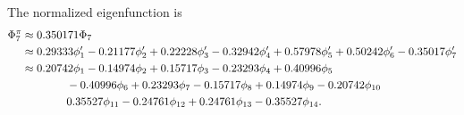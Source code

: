 \documentclass[a4paper]{book}
\begin{document}
\begin{solution}
\begin{enumerate}[label=(\alph*)]
\begin{itemize}
		The normalized eigenfunction is
		\begin{align}
			\Phi^\pi_7 &\approx 0.350171 \Phi_7 \notag \\
			&\approx 0.29333 \phi^\prime_1 - 0.21177 \phi^\prime_2 +0.22228 \phi^\prime_3 -0.32942 \phi^\prime_4 + 0.57978 \phi^\prime_5 + 0.50242 \phi^\prime_6 - 0.35017 \phi^\prime_7\\
			&\approx 0.20742 \phi_1 -0.14974 \phi_2 + 0.15717 \phi_3 -0.23293\phi_4 + 0.40996\phi_5  \notag \\
			&\hspace*{4em} -0.40996 \phi_6 +0.23293\phi_7 - 0.15717\phi_8 +0.14974 \phi_9 -0.20742 \phi_{10} \notag \\
			&\hspace*{4em} 0.35527 \phi_{11} -0.24761 \phi_{12} +0.24761 \phi_{13} -0.35527  \phi_{14} .
		\end{align}
		
		\end{itemize}
		

\end{enumerate}
\end{solution}
\end{document}
